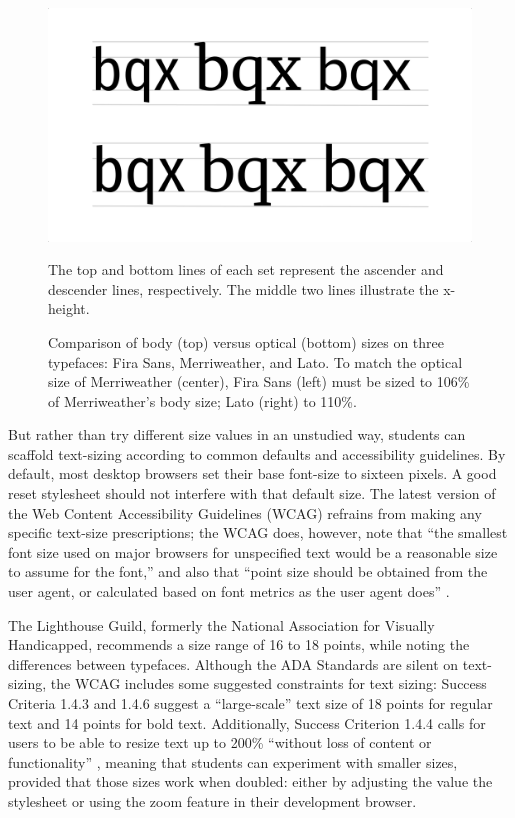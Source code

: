 \documentclass[sigconf,sigplan,review,anonymous]{acmart}
\begin{document}
\begin{figure}
  \includegraphics[width=\linewidth]{bvos}
  \caption{Comparison of body (top) versus optical (bottom) sizes on three typefaces: Fira Sans, Merriweather, and Lato. To match the optical size of Merriweather (center), Fira Sans (left) must be sized to 106\% of Merriweather's body size; Lato (right) to 110\%.} The top and bottom lines of each set represent the ascender and descender lines, respectively. The middle two lines illustrate the x-height.
  \label{fig:bvos}
\end{figure}


But rather than try different size values in an unstudied way, students can scaffold text-sizing according to common defaults and accessibility guidelines. By default, most desktop browsers set their base font-size to sixteen pixels. A good reset stylesheet should not interfere with that default size. The latest version of the Web Content Accessibility Guidelines (WCAG) refrains from making any specific text-size prescriptions; the WCAG does, however, note that “the smallest font size used on major browsers for unspecified text would be a reasonable size to assume for the font,” and also that “point size should be obtained from the user agent, or calculated based on font metrics as the user agent does” \cite{w3c:wcag}.

The Lighthouse Guild, formerly the National Association for Visually Handicapped, recommends a size range of 16 to 18 points, while noting the differences between typefaces\cite{lhg:mtl}. Although the ADA Standards are silent on text-sizing, the WCAG includes some suggested constraints for text sizing: Success Criteria 1.4.3 and 1.4.6 suggest a “large-scale” text size of 18 points for regular text and 14 points for bold text. Additionally, Success Criterion 1.4.4 calls for users to be able to resize text up to 200\% “without loss of content or functionality” \cite{w3c:wcag}, meaning that students can experiment with smaller sizes, provided that those sizes work when doubled: either by adjusting the value the stylesheet or using the zoom feature in their development browser.
\end{document}
